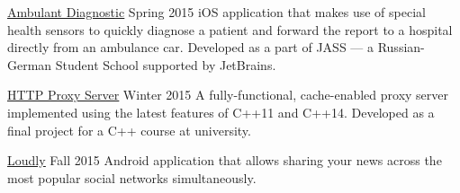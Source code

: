 
\begin{cvprojects}
    \cvproject
    {\underline{\href{https://research.jetbrains.org/groups/robolab/schools?id=9}{Ambulant Diagnostic}}}
    {Spring 2015}
    { iOS application that makes use of special health sensors to quickly diagnose a patient and forward the report to a hospital directly from an ambulance car. Developed as a part of JASS --- a Russian-German Student School supported by JetBrains.
    }

    \cvproject
    {\underline{\href{https://github.com/ZeRoGerc/cpp_proxy}{HTTP Proxy Server}}}
    {Winter 2015}
    {A fully-functional, cache-enabled proxy server implemented using the latest features of C++11 and C++14. Developed as a final project for a C++ course at university.}

    \cvproject
    {\underline{\href{https://github.com/ZeRoGerc/loudly}{Loudly}}}
    {Fall 2015}
    {Android application that allows sharing your news across the most popular social networks simultaneously.}

\end{cvprojects}